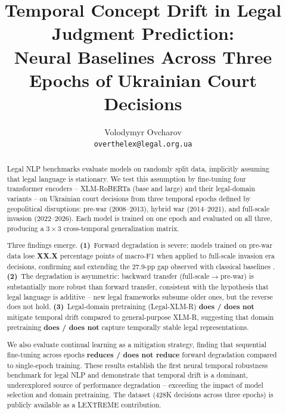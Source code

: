 \documentclass[11pt]{article}
\title{Temporal Concept Drift in Legal Judgment Prediction:\\
Neural Baselines Across Three Epochs of Ukrainian Court Decisions}
\author{Volodymyr Ovcharov\\
\texttt{overthelex@legal.org.ua}}
\date{}
\begin{document}
\maketitle

\begin{abstract}
Legal NLP benchmarks evaluate models on randomly split data, implicitly assuming that legal language is stationary. We test this assumption by fine-tuning four transformer encoders -- XLM-RoBERTa (base and large) and their legal-domain variants -- on Ukrainian court decisions from three temporal epochs defined by geopolitical disruptions: pre-war (2008--2013), hybrid war (2014--2021), and full-scale invasion (2022--2026). Each model is trained on one epoch and evaluated on all three, producing a $3 \times 3$ cross-temporal generalization matrix.

Three findings emerge. \textbf{(1)}~Forward degradation is severe: models trained on pre-war data lose \textbf{XX.X} percentage points of macro-F1 when applied to full-scale invasion era decisions, confirming and extending the 27.9-pp gap observed with classical baselines \citep{ovcharov2025tokenizer}. \textbf{(2)}~The degradation is asymmetric: backward transfer (full-scale$\rightarrow$pre-war) is substantially more robust than forward transfer, consistent with the hypothesis that legal language is additive -- new legal frameworks subsume older ones, but the reverse does not hold. \textbf{(3)}~Legal-domain pretraining (Legal-XLM-R) \textbf{does / does not} mitigate temporal drift compared to general-purpose XLM-R, suggesting that domain pretraining \textbf{does / does not} capture temporally stable legal representations.

We also evaluate continual learning as a mitigation strategy, finding that sequential fine-tuning across epochs \textbf{reduces / does not reduce} forward degradation compared to single-epoch training. These results establish the first neural temporal robustness benchmark for legal NLP and demonstrate that temporal drift is a dominant, underexplored source of performance degradation -- exceeding the impact of model selection and domain pretraining. The dataset (428K decisions across three epochs) is publicly available as a LEXTREME contribution.

\end{abstract}

\end{document}
